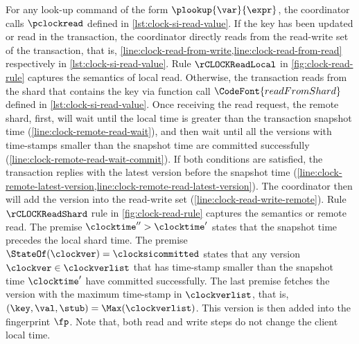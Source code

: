 For any look-up command of the form \( \plookup{\var}{\expr}\),
the coordinator calls \( \pclockread \) defined in \cref{lst:clock-si-read-value}.
If the key has been updated or read in the transaction, 
the coordinator directly reads from the read-write set of the transaction,
that is, \cref{line:clock-read-from-write,line:clock-read-from-read} respectively in \cref{lst:clock-si-read-value}.
Rule \( \rCLOCKReadLocal \) in \cref{fig:clock-read-rule} captures the semantics of local read.
Otherwise, the transaction reads from the shard that contains the key via function call \( \CodeFont{readFromShard}\) defined in \cref{lst:clock-si-read-value}.
Once receiving the read request,
the remote shard, first, will wait until the local time is greater than the transaction snapshot time (\cref{line:clock-remote-read-wait}),
and then wait until all the versions with time-stamps smaller than the snapshot time are committed successfully (\cref{line:clock-remote-read-wait-commit}).
If both conditions are satisfied,
the transaction replies with the latest version before the snapshot time (\cref{line:clock-remote-latest-version,line:clock-remote-read-latest-version}).
The coordinator then will add the version into the read-write set (\cref{line:clock-read-write-remote}).
Rule \( \rCLOCKReadShard \) rule in \cref{fig:clock-read-rule} captures the semantics or remote read.
The premise \(\clocktime'' > \clocktime'\) states that the snapshot time precedes the local shard time.
The premise \( \StateOf(\clockver) = \clocksicommitted  \) states that
any version \( \clockver \in \clockverlist \) that has time-stamp smaller than the snapshot time \( \clocktime' \) have committed successfully.
The last premise fetches the version with the maximum time-stamp in \( \clockverlist\),
that is, \( (\key,\val,\stub) = \Max(\clockverlist) \).
This version is then added into the fingerprint \( \fp \).
Note that, both read and write steps do not change the client local time.



